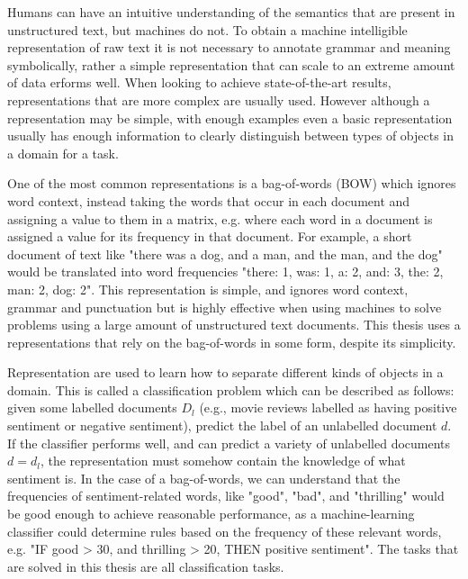 
Humans can have an intuitive understanding of the semantics that are present in unstructured text, but machines do not.  To obtain a machine intelligible representation of raw text it is not necessary to  annotate grammar and meaning symbolically, rather a simple representation that can scale to an extreme amount of data erforms well. When looking to achieve state-of-the-art results, representations that are more complex are usually used. However although a representation may be simple, with enough examples even a basic representation usually has enough information to clearly distinguish between types of objects in a domain for a task. 

One of the most common representations is a bag-of-words (BOW) which ignores word context, instead taking the words that occur in each document and assigning a value to them in a matrix, e.g. where each word in a document is assigned a value for  its frequency in that document. For example, a short document of text like "there was a dog, and a man, and the man, and the dog" would be translated into word frequencies "there: 1, was: 1, a: 2, and: 3, the: 2, man: 2, dog: 2". This representation is simple, and ignores word context, grammar and punctuation but is highly effective when using machines to solve problems using a large amount of unstructured text documents. This thesis uses a representations that rely on the bag-of-words in some form, despite its simplicity.


Representation are  used to learn how to separate different kinds of objects in a domain. This is called a classification problem which can be described as follows: given some labelled documents $D_l$ (e.g., movie reviews labelled as having positive sentiment or negative sentiment), predict the label of an unlabelled document $d$. If the classifier performs well, and can predict a variety of unlabelled documents $d = d_l$, the representation must somehow contain the knowledge of what sentiment is. In the case of a bag-of-words, we can understand that the frequencies of sentiment-related words, like "good", "bad", and "thrilling" would be good enough to achieve reasonable performance, as a machine-learning classifier could determine rules based on the frequency of these relevant words, e.g. "IF good > 30, and thrilling > 20, THEN positive sentiment". The tasks that are solved in this thesis are all classification tasks. 

